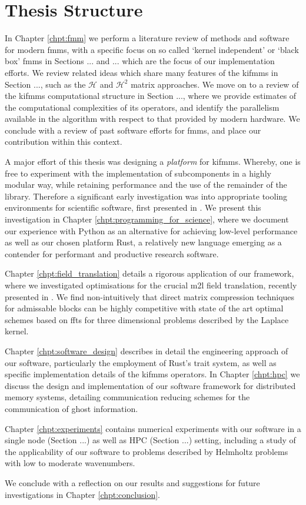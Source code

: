 \section{Thesis Structure}\label{chpt:fmm:sec:layout}


In Chapter \ref{chpt:fmm} we perform a literature review of methods and software for modern \acrlong{fmm}s, with a specific focus on so called `kernel independent' or `black box' \acrshort{fmm}s in Sections ... and ... which are the focus of our implementation efforts. We review related ideas which share many features of the \acrshort{kifmm}s in Section ..., such as the $\mathcal{H}$ and $\mathcal{H}^2$ matrix approaches. We move on to a review of the \acrshort{kifmm}s computational structure in Section ..., where we provide estimates of the computational complexities of its operators, and identify the parallelism available in the algorithm with respect to that provided by modern hardware. We conclude with a review of past software efforts for \acrshort{fmm}s, and place our contribution within this context.


A major effort of this thesis was designing a \textit{platform} for \acrshort{kifmm}s. Whereby, one is free to experiment with the implementation of subcomponents in a highly modular way, while retaining performance and the use of the remainder of the library. Therefore a significant early investigation was into appropriate tooling environments for scientific software, first presented in \cite{kailasa2022pyexafmm}. We present this investigation in Chapter \ref{chpt:programming_for_science}, where we document our experience with Python as an alternative for achieving low-level performance as well as our chosen platform Rust, a relatively new language emerging as a contender for performant and productive research software.

Chapter \ref{chpt:field_translation} details a rigorous application of our framework, where we investigated optimisations for the crucial \acrshort{m2l} field translation, recently presented in \cite{kailasa2024m2ltranslationoperatorskernel}. We find non-intuitively that direct matrix compression techniques for admissable blocks can be highly competitive with state of the art optimal schemes based on \acrshort{ffts} for three dimensional problems described by the Laplace kernel.

Chapter \ref{chpt:software_design} describes in detail the engineering approach of our software, particularly the employment of Rust's trait system, as well as specific implementation details of the \acrshort{kifmm}s operators. In Chapter \ref{chpt:hpc} we discuss the design and implementation of our software framework for distributed memory systems, detailing communication reducing schemes for the communication of ghost information.

Chapter \ref{chpt:experiments} contains numerical experiments with our software in a single node (Section ...) as well as HPC (Section ...) setting, including a study of the applicability of our software to problems described by Helmholtz problems with low to moderate wavenumbers.


We conclude with a reflection on our results and suggestions for future investigations in Chapter \ref{chpt:conclusion}.

